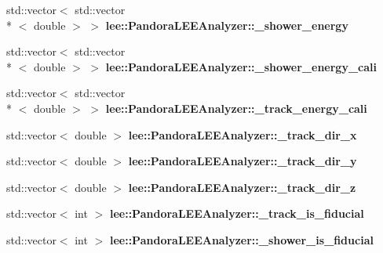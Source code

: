 \begin{DoxyCompactItemize}
\item 
\hypertarget{group__lee_gaf1fab9490fef935944f24feb7450f76c}{std\-::vector$<$ std\-::vector\\*
$<$ double $>$ $>$ {\bfseries lee\-::\-Pandora\-L\-E\-E\-Analyzer\-::\-\_\-shower\-\_\-energy}}\label{group__lee_gaf1fab9490fef935944f24feb7450f76c}

\item 
\hypertarget{group__lee_gac5a201dfcee71af90a4076c07a959ebf}{std\-::vector$<$ std\-::vector\\*
$<$ double $>$ $>$ {\bfseries lee\-::\-Pandora\-L\-E\-E\-Analyzer\-::\-\_\-shower\-\_\-energy\-\_\-cali}}\label{group__lee_gac5a201dfcee71af90a4076c07a959ebf}

\item 
\hypertarget{group__lee_gabc42592a0839c13f76a4eb677328cfb3}{std\-::vector$<$ std\-::vector\\*
$<$ double $>$ $>$ {\bfseries lee\-::\-Pandora\-L\-E\-E\-Analyzer\-::\-\_\-track\-\_\-energy\-\_\-cali}}\label{group__lee_gabc42592a0839c13f76a4eb677328cfb3}

\item 
\hypertarget{group__lee_ga8a992d49401db441d8c6e890ce1c1bce}{std\-::vector$<$ double $>$ {\bfseries lee\-::\-Pandora\-L\-E\-E\-Analyzer\-::\-\_\-track\-\_\-dir\-\_\-x}}\label{group__lee_ga8a992d49401db441d8c6e890ce1c1bce}

\item 
\hypertarget{group__lee_ga28bd177e5a7cacbd35fb5aec0865cd57}{std\-::vector$<$ double $>$ {\bfseries lee\-::\-Pandora\-L\-E\-E\-Analyzer\-::\-\_\-track\-\_\-dir\-\_\-y}}\label{group__lee_ga28bd177e5a7cacbd35fb5aec0865cd57}

\item 
\hypertarget{group__lee_ga2349ca54f697314697ff75504bbf042e}{std\-::vector$<$ double $>$ {\bfseries lee\-::\-Pandora\-L\-E\-E\-Analyzer\-::\-\_\-track\-\_\-dir\-\_\-z}}\label{group__lee_ga2349ca54f697314697ff75504bbf042e}

\item 
\hypertarget{group__lee_ga0c6ecffb2e944bd9842a1bbc1f6a05f1}{std\-::vector$<$ int $>$ {\bfseries lee\-::\-Pandora\-L\-E\-E\-Analyzer\-::\-\_\-track\-\_\-is\-\_\-fiducial}}\label{group__lee_ga0c6ecffb2e944bd9842a1bbc1f6a05f1}

\item 
\hypertarget{group__lee_ga97495f8c6c496aefe56f07f06a5a55ce}{std\-::vector$<$ int $>$ {\bfseries lee\-::\-Pandora\-L\-E\-E\-Analyzer\-::\-\_\-shower\-\_\-is\-\_\-fiducial}}\label{group__lee_ga97495f8c6c496aefe56f07f06a5a55ce}


\end{DoxyCompactItemize}
